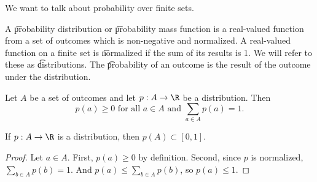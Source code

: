 

We want to talk about probability over finite sets.


A \t{probability distribution} or \t{probability mass function} is a real-valued function from a set of outcomes which is non-negative and normalized.
A real-valued function on a finite set is \t{normalized} if the sum of its results is 1.
We will refer to these as \t{distributions}.
The \t{probability of an outcome} is the result of the outcome under the distribution.


Let $A$ be a set of outcomes and let $p: A \to \R$ be a distribution.
Then
\[
  p(a) \geq 0 \text{ for all } a \in A \text{ and } \sum_{a \in A} p(a) = 1.
\]

\begin{prop}
If $p: A \to \R$ is a distribution, then $p(A) \subset [0, 1]$.
\begin{proof}

Let $a \in A$.
First, $p(a) \geq 0$ by definition.
Second, since $p$ is normalized, $\sum_{b \in A} p(b) = 1$.
And $p(a) \leq \sum_{b \in A} p(b)$, so $p(a) \leq 1$.

\end{proof}

\end{prop}

\blankpage
